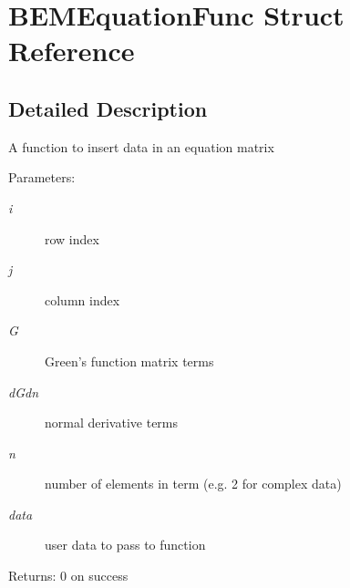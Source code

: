 \section{BEMEquationFunc Struct Reference}
\label{structBEMEquationFunc}


\subsection{Detailed Description}
A function to insert data in an equation matrix

\begin{Desc}
\item[Parameters:]
\begin{description}
\item[{\em i}]row index \item[{\em j}]column index \item[{\em G}]Green's function matrix terms \item[{\em dGdn}]normal derivative terms \item[{\em n}]number of elements in term (e.g. 2 for complex data) \item[{\em data}]user data to pass to function\end{description}
\end{Desc}
\begin{Desc}
\item[Returns:]0 on success \end{Desc}


